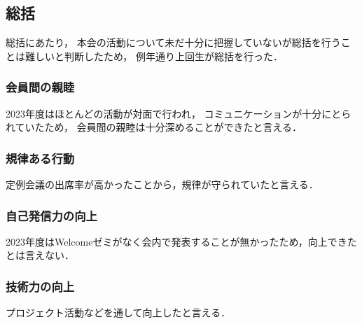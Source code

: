 \subsection*{\firstGrade{}総括}


\firstGrade{}総括にあたり，
本会の活動について未だ十分に把握していない\firstGrade{}が総括を行うことは難しいと判断したため，
例年通り上回生が総括を行った．

\subsubsection*{会員間の親睦}
2023年度はほとんどの活動が対面で行われ，
コミュニケーションが十分にとられていたため，
会員間の親睦は十分深めることができたと言える．

\subsubsection*{規律ある行動}
定例会議の出席率が高かったことから，規律が守られていたと言える．

\subsubsection*{自己発信力の向上}
2023年度はWelcomeゼミがなく会内で発表することが無かったため，向上できたとは言えない．

\subsubsection*{技術力の向上}
プロジェクト活動などを通して向上したと言える．
